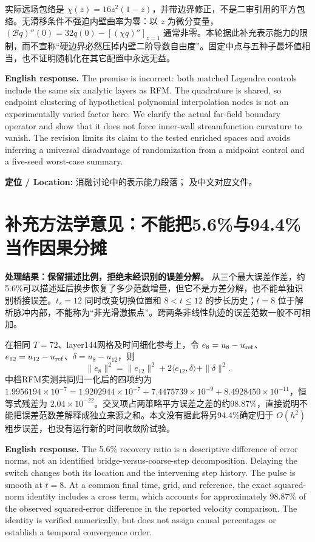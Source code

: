 实际远场包络是 $\chi(z)=16z^2(1-z)$，并带边界修正，不是二审引用的平方包络。无滑移条件不强迫内壁曲率为零：以 $z$ 为微分变量，$(\mathcal Bq)''(0)=32q(0)-[(\chi q)'']_{z=1}$ 通常非零。本轮据此补充表示能力的限制，而不宣称“硬边界必然压掉内壁二阶导数自由度”。固定中点与五种子最坏值相当，也不证明随机化在其它配置中永远无益。

\noindent\textbf{English response.}
The premise is incorrect: both matched Legendre controls include the same six analytic layers as RFM. The quadrature is shared, so endpoint clustering of hypothetical polynomial interpolation nodes is not an experimentally varied factor here. We clarify the actual far-field boundary operator and show that it does not force inner-wall streamfunction curvature to vanish. The revision limits its claim to the tested enriched spaces and avoids inferring a universal disadvantage of randomization from a midpoint control and a five-seed worst-case summary.

\noindent\textbf{定位 / Location:} 消融讨论中的表示能力段落； 及中文对应文件。

\section{补充方法学意见：不能把5.6\%与94.4\%当作因果分摊}
\textbf{处理结果：保留描述比例，拒绝未经识别的误差分解。}
从三个最大误差作差，约5.6\%可以描述延后换步恢复了多少范数增量，但它不是方差分解，也不能单独识别桥接误差。$t_s=12$ 同时改变切换位置和 $8<t\leq12$ 的步长历史；$t=8$ 位于解析脉冲内部，不能称为“非光滑激振点”。跨两条非线性轨迹的误差范数一般不可相加。

在相同 $T=72$、layer144网格及时间细化参考上，令 $e_8=u_8-u_{\rm ref}$、$e_{12}=u_{12}-u_{\rm ref}$、$\delta=u_8-u_{12}$，则
\[
 \|e_8\|^2=\|e_{12}\|^2+2\langle e_{12},\delta\rangle+\|\delta\|^2.
\]
中档RFM实测共同归一化后的四项约为
$1.9956194\times10^{-7}=1.9202944\times10^{-7}+7.4475739\times10^{-9}+8.4928450\times10^{-11}$，恒等式残差为 $2.04\times10^{-22}$。交叉项占两策略平方误差之差的约98.87\%，直接说明不能把误差范数差解释成独立来源之和。本文没有据此将另94.4\%确定归于 $O(h^2)$ 粗步误差，也没有运行新的时间收敛阶试验。

\noindent\textbf{English response.}
The 5.6\% recovery ratio is a descriptive difference of error norms, not an identified bridge-versus-coarse-step decomposition. Delaying the switch changes both its location and the intervening step history. The pulse is smooth at $t=8$. At a common final time, grid, and reference, the exact squared-norm identity includes a cross term, which accounts for approximately $98.87\%$ of the observed squared-error difference in the reported velocity comparison. The identity is verified numerically, but does not assign causal percentages or establish a temporal convergence order.

